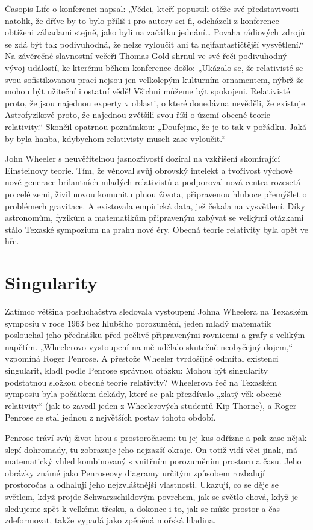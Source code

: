   Časopis Life o konferenci napsal: „Vědci, kteří popustili otěže své představivosti natolik, že
  dříve by to bylo příliš i pro autory sci-fi, odcházeli z konference obtíženi záhadami stejně, jako
  byli na začátku jednání… Povaha rádiových zdrojů se zdá být tak podivuhodná, že nelze vyloučit ani
  ta nejfantastičtější vysvětlení.“ Na závěrečné slavnostní večeři Thomas Gold shrnul ve své řeči
  podivuhodný vývoj událostí, ke kterému během konference došlo: „Ukázalo se, že relativisté se svou
  sofistikovanou prací nejsou jen velkolepým kulturním ornamentem, nýbrž že mohou být užiteční i
  ostatní vědě! Všichni můžeme být spokojeni. Relativisté proto, že jsou najednou experty v oblasti,
  o které donedávna nevěděli, že existuje. Astrofyzikové proto, že najednou zvětšili svou říši o
  území obecné teorie relativity.“ Skončil opatrnou poznámkou: „Doufejme, že je to tak v pořádku.
  Jaká by byla hanba, kdybychom relativisty museli zase vyloučit.“ 

  John Wheeler s neuvěřitelnou jasnozřivostí dozíral na vzkříšení skomírající Einsteinovy teorie.
  Tím, že věnoval svůj obrovský intelekt a tvořivost výchově nové generace brilantních mladých
  relativistů a podporoval nová centra rozesetá po celé zemi, živil novou komunitu plnou života,
  připravenou hluboce přemýšlet o problémech gravitace. A existovala empirická data, jež čekala na
  vysvětlení. Díky astronomům, fyzikům a matematikům připraveným zabývat se velkými otázkami stálo
  Texaské sympozium na prahu nové éry. Obecná teorie relativity byla opět ve hře. 

\section{Singularity}\label{kulIchIIIsecIX}
  Zatímco většina posluchačstva sledovala vystoupení Johna Wheelera na Texaském symposiu v roce 1963
  bez hlubšího porozumění, jeden mladý matematik poslouchal jeho přednášku před pečlivě připravenými
  rovnicemi a grafy s velikým napětím. „Wheelerovo vystoupení na mě udělalo skutečně neobyčejný
  dojem,“ vzpomíná Roger Penrose. A přestože Wheeler tvrdošíjně odmítal existenci singularit, kladl
  podle Penrose správnou otázku: Mohou být singularity podstatnou složkou obecné teorie relativity?
  Wheelerova řeč na Texaském symposiu byla počátkem dekády, které se pak přezdívalo „zlatý věk
  obecné relativity“ (jak to zavedl jeden z Wheelerových studentů Kip Thorne), a Roger Penrose se
  stal jednou z největších postav tohoto období. 

  Penrose tráví svůj život hrou s prostoročasem: tu jej kus odřízne a pak zase nějak slepí
  dohromady, tu zobrazuje jeho nejzazší okraje. On totiž vidí věci jinak, má matematický vhled
  kombinovaný s vnitřním porozuměním prostoru a času. Jeho obrázky známé jako Penroseovy diagramy
  určitým způsobem rozbalují prostoročas a odhalují jeho nejzvláštnější vlastnosti. Ukazují, co se
  děje se světlem, když projde Schwarzschildovým povrchem, jak se světlo chová, když je sledujeme
  zpět k velkému třesku, a dokonce i to, jak se může prostor a čas zdeformovat, takže vypadá jako
  zpěněná mořská hladina. 

